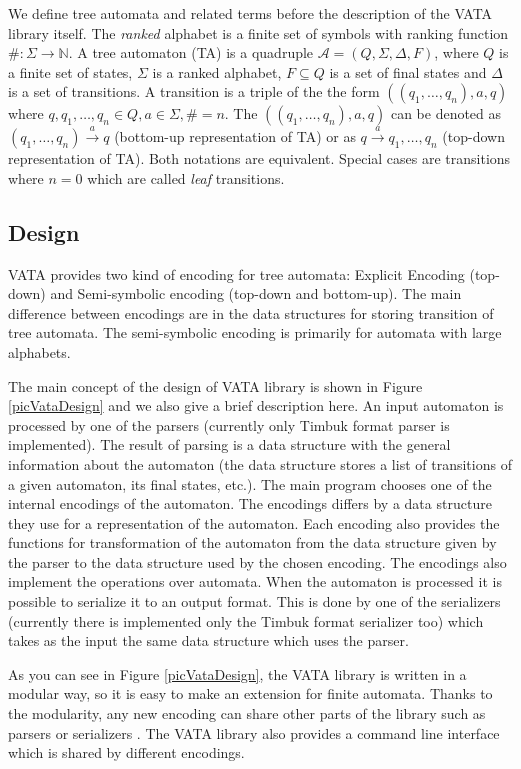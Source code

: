 We define tree automata and related terms before the description of the VATA library itself. The \emph{ranked} alphabet is a finite set of symbols
with ranking function 
$\#:\Sigma\rightarrow \mathbb{N}$. A tree automaton (TA) is a quadruple $\mathcal{A}=(Q,\Sigma,\Delta,F)$, where $Q$ is a finite set of states, $\Sigma$
is a ranked alphabet, $F\subseteq Q$ is a set of final states and $\Delta$ is a set of transitions. A transition is a triple of the the form
$((q_1,\ldots,q_n),a,q)$ where $q,q_1,\ldots,q_n \in Q, a\in \Sigma, \#=n$. The $((q_1,\ldots,q_n),a,q)$ can be denoted as $(q_1,\ldots,q_n)\xrightarrow{a}q$
(bottom-up representation of TA) or as $q\xrightarrow{a}q_1,\ldots,q_n$ (top-down representation of TA). Both notations are equivalent. Special cases
are transitions where $n=0$ which are called \emph{leaf} transitions.

\subsection{Design}
\label{sectionDesignVata}
VATA provides two kind of encoding for tree automata: Explicit Encoding (top-down) and Semi-symbolic encoding (top-down and bottom-up). The main difference
between encodings are
in the data structures for storing transition of tree automata. The semi-symbolic encoding is primarily for automata with large alphabets. 

The main concept of the design of VATA library is shown in Figure \ref{picVataDesign} and we also give a brief description here. 
An input automaton is processed by one of the parsers (currently
only Timbuk format parser is implemented). The result of parsing is a data structure with the general information about the automaton 
(the data structure stores a list
of transitions of a given automaton, its final states, etc.). The main program chooses one of the internal encodings of the automaton. The encodings
differs by a data structure they use for a representation of the automaton. Each encoding also provides the functions for transformation of the automaton 
from the data structure given by the parser to the data structure used by the chosen encoding. The encodings also implement
the operations over automata. When the automaton is processed it is possible to serialize it to an output format. 
This is done by one of the serializers (currently there is implemented only the Timbuk format serializer too) 
which takes as the input the same data structure which uses the parser.

As you can see in Figure \ref{picVataDesign}, the VATA library is written in a modular way, so it is easy to make an extension for finite automata. 
Thanks to the modularity, any new encoding can share other parts of the library such as parsers or serializers \cite{libvata}. 
The VATA library also provides a command line interface which is shared by different encodings.

